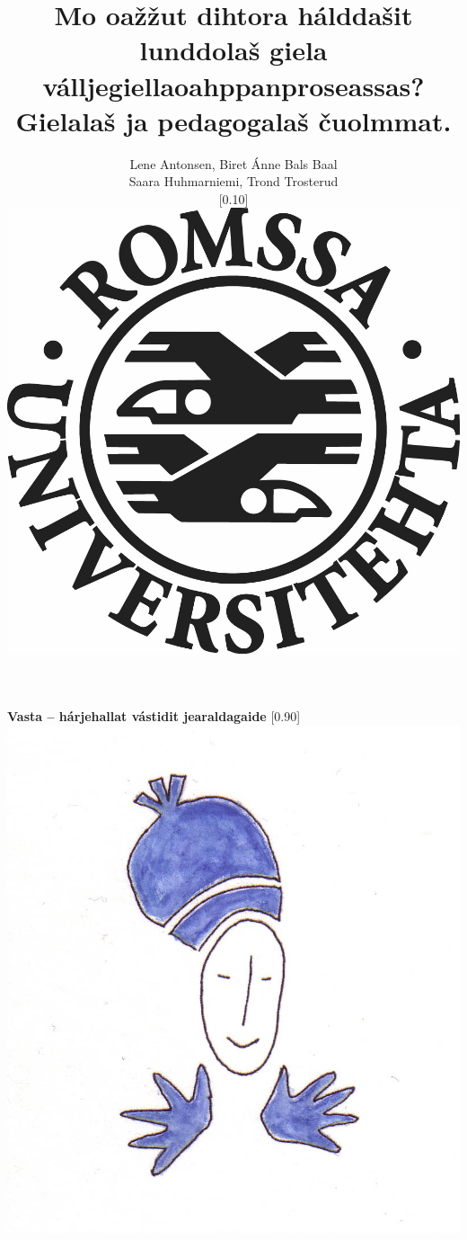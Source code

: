 \documentclass[landscape,norsk,11pt]{seminar}
\title{Mo oažžut dihtora hálddašit lunddolaš giela vállje\ngvejolašvuođaid giellaoahppanproseassas?  Gielalaš ja pedagogalaš čuolmmat.}
\author{Lene Antonsen, Biret Ánne Bals Baal\\
Saara Huhmarniemi, Trond Trosterud \\
 \scalebox{0.10}[0.10]{\includegraphics{img/LogoSamisk}}}
\date{}
\begin{document}
\begin{slide}

\maketitle







\newslide
\textbf{Vasta -- hárjehallat vástidit jearaldagaide}
\scalebox{0.90}[0.90]{\includegraphics{img/vasta.png}} \\



\end{slide}
\end{document}
